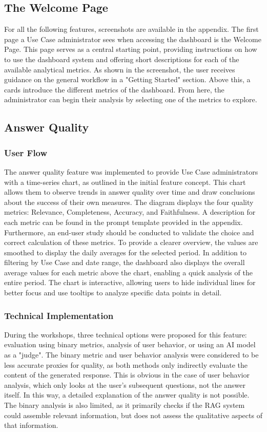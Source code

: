 \documentclass[
	english,
	ruledheaders=section,%
	class=report,%
	thesis={type=bachelor},%
	accentcolor=1b,%
	custommargins=true,%
	marginpar=false,%
	parskip=half-,%
	fontsize=11pt,%
	DIV=14,
]{tudapub}
\begin{document}
\subsection{The Welcome Page}
For all the following features, screenshots are available in the appendix.
The first page a Use Case administrator sees when accessing the dashboard is the Welcome Page. This page serves as a central starting point, providing instructions on how to use the dashboard system and offering short descriptions for each of the available analytical metrics. As shown in the screenshot, the user receives guidance on the general workflow in a "Getting Started" section. Above this, a cards introduce the different metrics of the dashboard. From here, the administrator can begin their analysis by selecting one of the metrics to explore.
\subsection{Answer Quality}
\subsubsection{User Flow}
The answer quality feature was implemented to provide Use Case administrators with a time-series chart, as outlined in the initial feature concept. This chart allows them to observe trends in answer quality over time and draw conclusions about the success of their own measures. The diagram displays the four quality metrics: Relevance, Completeness, Accuracy, and Faithfulness. A description for each metric can be found in the prompt template provided in the appendix. Furthermore, an end-user study should be conducted to validate the choice and correct calculation of these metrics. To provide a clearer overview, the values are smoothed to display the daily averages for the selected period. In addition to filtering by Use Case and date range, the dashboard also displays the overall average values for each metric above the chart, enabling a quick analysis of the entire period. The chart is interactive, allowing users to hide individual lines for better focus and use tooltips to analyze specific data points in detail.

\subsubsection{Technical Implementation}
During the workshops, three technical options were proposed for this feature: evaluation using binary metrics, analysis of user behavior, or using an AI model as a "judge". The binary metric and user behavior analysis were considered to be less accurate proxies for quality, as both methods only indirectly evaluate the content of the generated response. This is obvious in the case of user behavior analysis, which only looks at the user's subsequent questions, not the answer itself. In this way, a detailed explanation of the answer quality is not possible. The binary analysis is also limited, as it primarily checks if the RAG system could assemble relevant information, but does not assess the qualitative aspects of that information.
\end{document}
